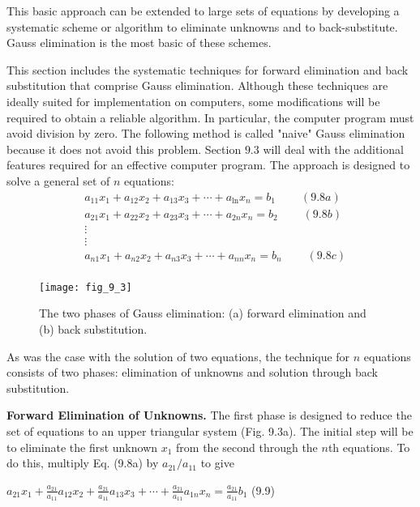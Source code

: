 \documentclass[../main.tex]{subfiles}
\begin{document}
This basic approach can be extended to large sets of equations by developing a systematic scheme or algorithm to eliminate unknowns and to back-substitute. Gauss elimination is the most basic of these schemes.

This section includes the systematic techniques for forward elimination and back substitution that comprise Gauss elimination. Although these techniques are ideally suited for implementation on computers, some modifications will be required to obtain a reliable algorithm. In particular, the computer program must avoid division by zero. The following method is called "naive" Gauss elimination because it does not avoid this problem. Section $9.3$ will deal with the additional features required for an effective computer program.
The approach is designed to solve a general set of $n$ equations:
$$
\begin{aligned}
&a_{11} x_{1}+a_{12} x_{2}+a_{13} x_{3}+\cdots+a_{\ln } x_{n}=b_{1} \ \ \ \ \ \ \ \ \ \ (9.8a)\\
&a_{21} x_{1}+a_{22} x_{2}+a_{23} x_{3}+\cdots+a_{2 n} x_{n}=b_{2} \ \ \ \ \ \ \ \ \ \ (9.8b)\\
&\vdots \\
&\vdots \\
&a_{n 1} x_{1}+a_{n 2} x_{2}+a_{n 3} x_{3}+\cdots+a_{n n} x_{n}=b_{n} \ \ \ \ \ \ \ \ \ \ (9.8c)\\
\end{aligned}
$$

\begin{figure}[H]
    \centering
    \texttt{[image: fig\_9\_3]}
    \caption{\textsf{The two phases of Gauss elimination: (a) forward elimination and (b) back substitution.}}
    \label{fig:fig_9_3}
\end{figure}

As was the case with the solution of two equations, the technique for $n$ equations consists of two phases: elimination of unknowns and solution through back substitution.
\bigskip

\noindent\textbf{Forward Elimination of Unknowns.} The first phase is designed to reduce the set of equations to an upper triangular system (Fig. 9.3a). The initial step will be to eliminate the first unknown $x_{1}$ from the second through the $n$th equations. To do this, multiply Eq. (9.8a) by $a_{21} / a_{11}$ to give
\bigskip

$a_{21} x_{1}+\frac{a_{21}}{a_{11}} a_{12} x_{2}+\frac{a_{21}}{a_{11}} a_{13} x_{3}+\cdots+\frac{a_{21}}{a_{11}} a_{1 n} x_{n}=\frac{a_{21}}{a_{11}} b_{1}$ \hfill{(9.9)}
\bigskip
\end{document}
